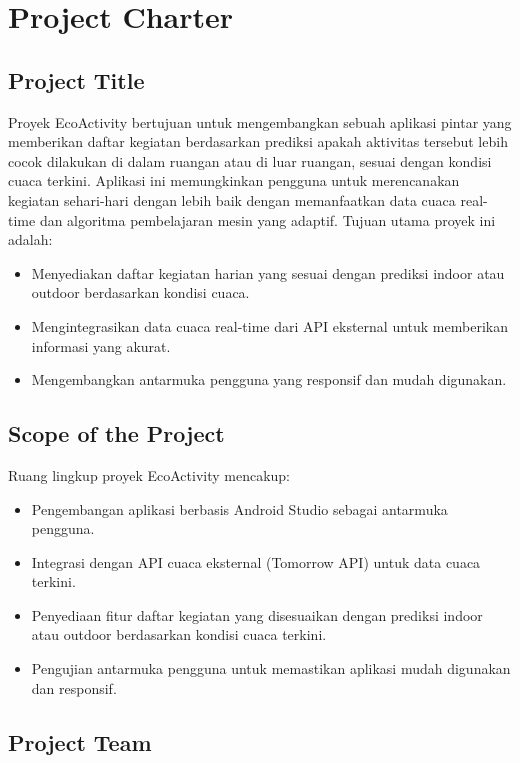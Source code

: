 \documentclass[journal,article,submit,pdftex,moreauthors]{Definitions/mdpi}
\begin{document}
\section{Project Charter}

\subsection{Project Title}
Proyek EcoActivity bertujuan untuk mengembangkan sebuah aplikasi pintar yang memberikan daftar kegiatan berdasarkan prediksi apakah aktivitas tersebut lebih cocok dilakukan di dalam ruangan atau di luar ruangan, sesuai dengan kondisi cuaca terkini. Aplikasi ini memungkinkan pengguna untuk merencanakan kegiatan sehari-hari dengan lebih baik dengan memanfaatkan data cuaca real-time dan algoritma pembelajaran mesin yang adaptif. Tujuan utama proyek ini adalah: \begin{itemize} 
\item Menyediakan daftar kegiatan harian yang sesuai dengan prediksi indoor atau outdoor berdasarkan kondisi cuaca. 
\item Mengintegrasikan data cuaca real-time dari API eksternal untuk memberikan informasi yang akurat. 
\item Mengembangkan antarmuka pengguna yang responsif dan mudah digunakan. 
\end{itemize}

\subsection{Scope of the Project}

Ruang lingkup proyek EcoActivity mencakup: \begin{itemize} 
\item Pengembangan aplikasi berbasis Android Studio sebagai antarmuka pengguna. 
\item Integrasi dengan API cuaca eksternal (Tomorrow API) untuk data cuaca terkini.
\item Penyediaan fitur daftar kegiatan yang disesuaikan dengan prediksi indoor atau outdoor berdasarkan kondisi cuaca terkini. 
\item Pengujian antarmuka pengguna untuk memastikan aplikasi mudah digunakan dan responsif.

\end{itemize}

\subsection{Project Team}
\end{document}
